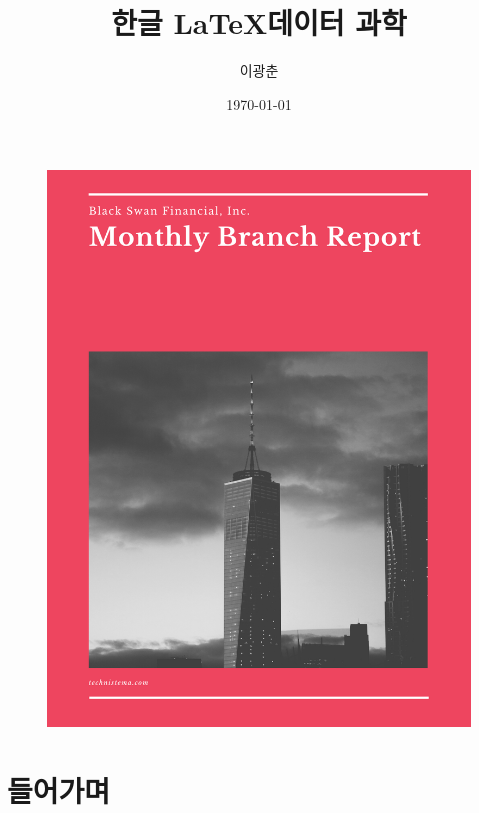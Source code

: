 \documentclass[a4paper]{article}
\title{한글 \LaTeX 데이터 과학}
\author{이광춘}
\date{\today}
\begin{document}
	
	\thispagestyle{empty}
	\begin{figure}[htb]
		\includegraphics[width=\linewidth*1.3]{cover-pro-report}
	\end{figure}
	
	\maketitle
	
	\section{들어가며}
	\jiwon
\end{document}
